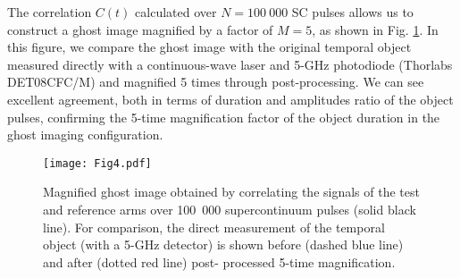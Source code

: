 \documentclass[aip,graphicx]{revtex4-1}
\begin{document}
The correlation {$C(t)$} calculated over $N = 100~000$ SC pulses allows us to construct a ghost image magnified by a factor of $M= 5$, as shown in Fig. \ref{fig:ghost_image}. In this figure, we compare the ghost image with the original temporal object measured directly with a continuous-wave laser and 5-GHz photodiode (Thorlabs DET08CFC/M) and magnified 5 times through post-processing. We can see excellent agreement, both in terms of duration and amplitudes ratio of the object pulses, confirming the 5-time magnification factor of the object duration in the ghost imaging configuration.

\begin{figure}
	\texttt{[image: Fig4.pdf]}
	\caption{Magnified ghost image obtained by correlating the signals of the test and reference arms over 100~000 supercontinuum pulses (solid black line). For comparison, the direct measurement of the temporal object (with a 5-GHz detector) is shown before (dashed blue line) and after (dotted red line) post- processed 5-time magnification.}
	\label{fig:ghost_image}
\end{figure}
\end{document}
